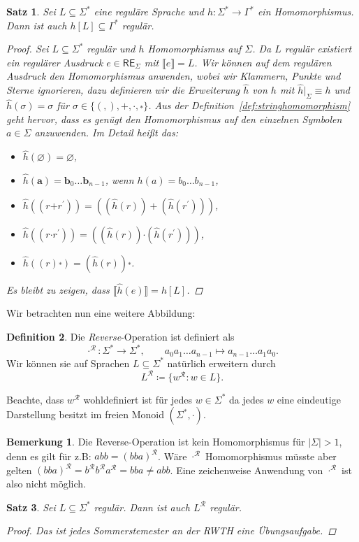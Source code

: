 \documentclass[11pt, a4paper]{article}
\theoremstyle{definition}
\newtheorem{definition}{Definition}[section]
\newtheorem*{remark*}{Bemerkung}
\theoremstyle{plain}
\newtheorem{theorem}[definition]{Satz}
\numberwithin{equation}{section}
\let\emptyset\varnothing
\begin{document}
\begin{theorem}
	Sei $L \subseteq \Sigma^\ast$ eine reguläre Sprache und $h\colon \Sigma^\ast \to \Gamma^\ast$ ein Homomorphismus. Dann ist auch $h[L] \subseteq \Gamma^\ast$ regulär.
	\begin{proof}
		Sei $L \subseteq \Sigma^\ast$ regulär und $h$ Homomorphismus auf $\Sigma$. Da $L$ regulär existiert ein regulärer Ausdruck $e \in \mathsf{RE}_\Sigma$ mit $\llbracket e \rrbracket = L$. Wir können auf dem regulären Ausdruck den Homomorphismus anwenden, wobei wir Klammern, Punkte und Sterne ignorieren, dazu definieren wir die Erweiterung $\hat{h}$ von $h$ mit $\hat{h} \vert_\Sigma \equiv h$ und $\hat{h}(\sigma) = \sigma$ für $\sigma \in \{(,),\bm{+}, \bm{\cdot}, \overset{\bm{\ast}}{}\}$. Aus der Definition~\ref{def:stringhomomorphism} geht hervor, dass es genügt den Homomorphismus auf den einzelnen Symbolen $a \in \Sigma$ anzuwenden. Im Detail heißt das: 
		\begin{itemize}
			\item $\hat{h}(\bm{\emptyset}) = \bm{\emptyset}$,
			\item $\hat{h}(\bm{a}) = \bm{b}_0 \ldots \bm{b}_{n-1}$, wenn $h(a) = b_0 \ldots b_{n-1}$,
			\item $\hat{h}((r \bm{+} r^\prime)) = ((\hat{h}(r)) + (\hat{h}(r^\prime)))$,
			\item $\hat{h}((r \bm{\cdot} r^\prime)) = ((\hat{h}(r)) \bm{\cdot} (\hat{h}(r^\prime)))$,
			\item $\hat{h}((r)\overset{\bm{\ast}}{}) = (\hat{h}(r))\overset{\bm{\ast}}{}$.
		\end{itemize} 
		Es bleibt zu zeigen, dass $\llbracket \hat{h}(e) \rrbracket = h[L]$.
	\end{proof}
\end{theorem}
Wir betrachten nun eine weitere Abbildung:
\begin{definition}
	Die \textit{Reverse}-Operation ist definiert als
	$$
		\cdot^\mathcal{R} \colon \Sigma^\ast \to \Sigma^\ast, \quad\quad a_0 a_1 \ldots a_{n-1} \mapsto a_{n-1} \ldots a_1 a_0.
	$$
	Wir können sie auf Sprachen $L \subseteq \Sigma^\ast$ natürlich erweitern durch
	$$
		L^\mathcal{R} \coloneqq \{ w^\mathcal{R} : w \in L \}.
	$$
\end{definition}
Beachte, dass $w^\mathcal{R}$ wohldefiniert ist für jedes $w \in \Sigma
^\ast$ da jedes $w$ eine eindeutige Darstellung besitzt im freien Monoid $(\Sigma^\ast, \cdot)$.
\begin{remark*}
	Die Reverse-Operation ist kein Homomorphismus für $|\Sigma| > 1$, denn es gilt für z.B: $abb = (bba)^\mathcal{R}$. Wäre $\cdot^\mathcal{R}$ Homomorphismus müsste aber gelten $(bba)^\mathcal{R} = b^\mathcal{R} b^\mathcal{R} a^\mathcal{R} = bba \neq abb$. Eine zeichenweise Anwendung von $\cdot^\mathcal{R}$ ist also nicht möglich.
\end{remark*}
\begin{theorem}
	Sei $L \subseteq \Sigma^\ast$ regulär. Dann ist auch $L^\mathcal{R}$ regulär.
	\begin{proof}
		Das ist jedes Sommerstemester an der RWTH eine Übungsaufgabe.
	\end{proof}
\end{theorem}
\end{document}
